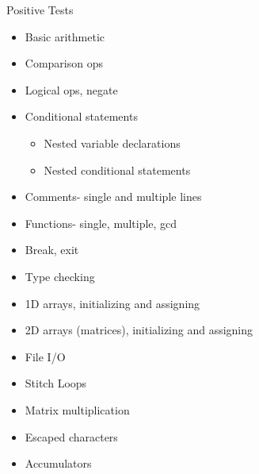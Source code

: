 \documentclass[11pt, oneside]{article}   	%
\begin{document}
Positive Tests\\
\begin{itemize}
\item Basic arithmetic
\item Comparison ops
\item Logical ops, negate
\item Conditional statements
\begin{itemize}
\item Nested variable declarations
\item Nested conditional statements
\end{itemize}
\item Comments- single and multiple lines
\item Functions- single, multiple, gcd
\item Break, exit
\item Type checking
\item 1D arrays, initializing and assigning
\item 2D arrays (matrices), initializing and assigning
\item File I/O
\item Stitch Loops
\item Matrix multiplication
\item Escaped characters
\item Accumulators
\end{itemize}

\newpage
\end{document}
